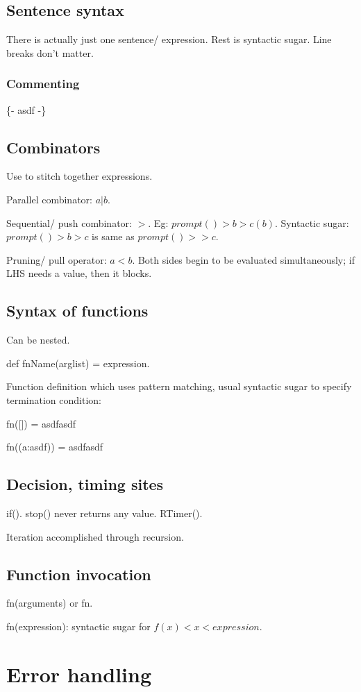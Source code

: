 \subsection{Sentence syntax}
There is actually just one sentence/ expression. Rest is syntactic sugar. Line breaks don't matter.

\subsubsection{Commenting}
\{- asdf -\}

\subsection{Combinators}
Use to stitch together expressions.

Parallel combinator: $a|b$.

Sequential/ push combinator: $>$. Eg: $prompt()>b>c(b)$. Syntactic sugar: $prompt()>b>c$ is same as $prompt()>>c$.

Pruning/ pull operator: $a<b$. Both sides begin to be evaluated simultaneously; if LHS needs a value, then it blocks.

\subsection{Syntax of functions}
Can be nested.

def fnName(arglist) = expression.

Function definition which uses pattern matching, usual syntactic sugar to specify termination condition:

fn([]) = asdfasdf

fn((a:asdf)) = asdfasdf

\subsection{Decision, timing sites}
if(). stop() never returns any value. RTimer().

Iteration accomplished through recursion.

\subsection{Function invocation}
fn(arguments) or fn.

fn(expression): syntactic sugar for $f(x)<x<expression$.

\section{Error handling}

